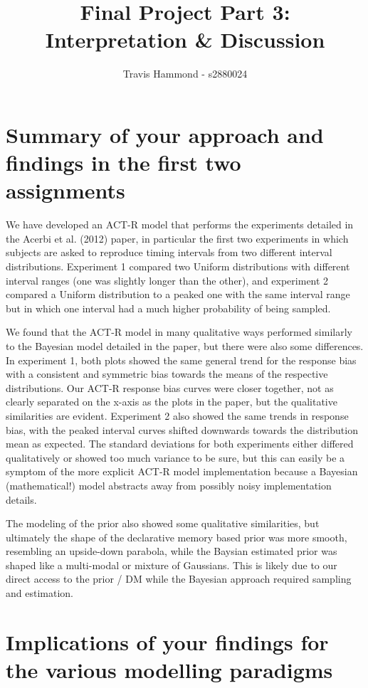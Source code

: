 \documentclass{article}
\title{Final Project Part 3: Interpretation \& Discussion}
\author{Travis Hammond - s2880024}
\begin{document}
\maketitle


\section{Summary of your approach and findings in the first two assignments}

We have developed an ACT-R model that performs the experiments detailed in the Acerbi et al. (2012) paper, in particular the first two experiments in which subjects are asked to reproduce timing intervals from two different interval distributions. Experiment 1 compared two Uniform distributions with different interval ranges (one was slightly longer than the other), and experiment 2 compared a Uniform distribution to a peaked one with the same interval range but in which one interval had a much higher probability of being sampled.

We found that the ACT-R model in many qualitative ways performed similarly to the Bayesian model detailed in the paper, but there were also some differences. In experiment 1, both plots showed the same general trend for the response bias with a consistent and symmetric bias towards the means of the respective distributions. Our ACT-R response bias curves were closer together, not as clearly separated on the x-axis as the plots in the paper, but the qualitative similarities are evident. Experiment 2 also showed the same trends in response bias, with the peaked interval curves shifted downwards towards the distribution mean as expected. The standard deviations for both experiments either differed qualitatively or showed too much variance to be sure, but this can easily be a symptom of the more explicit ACT-R model implementation because a Bayesian (mathematical!) model abstracts away from possibly noisy implementation details.

The modeling of the prior also showed some qualitative similarities, but ultimately the shape of the declarative memory based prior was more smooth, resembling an upside-down parabola, while the Baysian estimated prior was shaped like a multi-modal or mixture of Gaussians. This is likely due to our direct access to the prior / DM while the Bayesian approach required sampling and estimation.


\section{Implications of your findings for the various modelling paradigms}
\end{document}
